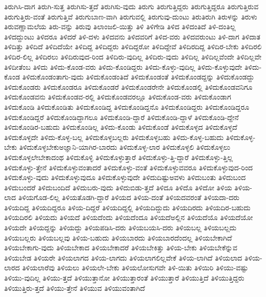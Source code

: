 {ತಿರುಗಿಸಿ-ದಾಗ
ತಿರುಗಿ-ಸುತ್ತ
ತಿರುಗಿಸು-ತ್ತದೆ
ತಿರುಗಿಸು-ವುದು
ತಿರುಗು
ತಿರುಗುತ್ತಿದ್ದರು
ತಿರುಗುತ್ತಿದ್ದರೂ
ತಿರುಗುತ್ತಿರುವ
ತಿರುಗುತ್ತಿರು-ವಂತೆ
ತಿರುಗುತ್ತಿವೆ
ತಿರುಗುಬಾಣ-ವಾಗಿ
ತಿರುಗುವಲ್ಲಿ
ತಿರುಗುವು-ದುಂಟು
ತಿರುತಿರುಗಿ
ತಿರುಳನ್ನು
ತಿರುಳು
ತಿರುವಣ್ಣಾಮಲೆಯ
ತಿರು-ವನ್ನು
ತಿರುವು
ತಿಲಾಂಜಲಿ-ಯಿತ್ತು
ತಿಳಿ
ತಿಳಿಗೇಡಿ
ತಿಳಿದ
ತಿಳಿದಂತಿದೆ
ತಿಳಿ-ದಂತಿಲ್ಲ
ತಿಳಿದದ್ದುಂಟು
ತಿಳಿದರೂ
ತಿಳಿದರೆ
ತಿಳಿ-ದಳು
ತಿಳಿದವನು
ತಿಳಿದವರಿಗೆ
ತಿಳಿದ-ವರು
ತಿಳಿದವರುಂಟು
ತಿಳಿ-ದಾಗ
ತಿಳಿದಾತ
ತಿಳಿದಿತ್ತು
ತಿಳಿದಿದೆ
ತಿಳಿದಿದೆಯೇ
ತಿಳಿದಿದ್ದ
ತಿಳಿದಿದ್ದರು
ತಿಳಿದಿದ್ದರೋ
ತಿಳಿದಿದ್ದೇವೆ
ತಿಳಿದಿರದಿದ್ದ
ತಿಳಿದಿರ-ಬೇಕು
ತಿಳಿದಿರಲಿ
ತಿಳಿದಿರ-ಲಿಲ್ಲ
ತಿಳಿದಿರಲು
ತಿಳಿದಿರುವುದ-ರಿಂದ
ತಿಳಿದಿರು-ವುದಿಲ್ಲ
ತಿಳಿದಿರು-ವುದು
ತಿಳಿದಿಲ್ಲ
ತಿಳಿದಿಲ್ಲವೆಂದೇ
ತಿಳಿದಿಲ್ಲವೇ
ತಿಳಿದೀತೆಂಬ
ತಿಳಿದು
ತಿಳಿದು-ಕೊಂಡ-ವರು
ತಿಳಿದು-ಕೊಂಡಿದ್ದರು
ತಿಳಿದು-ಕೊಳ್ಳು-ವುದಿಲ್ಲ
ತಿಳಿದು-ಕೊಳ್ಳುವುದೇ
ತಿಳಿದು-ಕೊಂಡ
ತಿಳಿದುಕೊಂಡಂತಾಗು-ವುದು
ತಿಳಿದುಕೊಂಡಂತಿದೆ
ತಿಳಿದುಕೊಂಡಂತೆ
ತಿಳಿದುಕೊಂಡದ್ದನ್ನು
ತಿಳಿದುಕೊಂಡದ್ದು
ತಿಳಿದುಕೊಂಡರು
ತಿಳಿದುಕೊಂಡರೂ
ತಿಳಿದುಕೊಂಡರೆ
ತಿಳಿದುಕೊಂಡರೇನೇ
ತಿಳಿದುಕೊಂಡಲ್ಲಿ
ತಿಳಿದುಕೊಂಡವನಿಗೂ
ತಿಳಿದುಕೊಂಡವನು
ತಿಳಿದುಕೊಂಡವ-ರಲ್ಲಿ
ತಿಳಿದುಕೊಂಡವರಲ್ಲೂ
ತಿಳಿದುಕೊಂಡ-ವರು
ತಿಳಿದುಕೊಂಡಾಗ
ತಿಳಿದುಕೊಂಡಿ
ತಿಳಿದುಕೊಂಡಿತು
ತಿಳಿದುಕೊಂಡಿದ್ದ
ತಿಳಿದುಕೊಂಡಿದ್ದನೊ
ತಿಳಿದುಕೊಂಡಿದ್ದರು
ತಿಳಿದುಕೊಂಡಿದ್ದರೂ
ತಿಳಿದುಕೊಂಡಿದ್ದರೆ
ತಿಳಿದುಕೊಂಡಿದ್ದಾಗಲೂ
ತಿಳಿದುಕೊಂಡಿ-ದ್ದಾರೆ
ತಿಳಿದುಕೊಂಡಿ-ದ್ದಾಳೆ
ತಿಳಿದುಕೊಂಡಿ-ದ್ದೇನೆ
ತಿಳಿದುಕೊಂಡಿರ-ಬಹುದು
ತಿಳಿದುಕೊಂಡಿಲ್ಲ
ತಿಳಿದು-ಕೊಂಡು
ತಿಳಿದುಕೊಂಡೆ
ತಿಳಿದುಕೊಳ್ಳದ
ತಿಳಿದುಕೊಳ್ಳದೆ
ತಿಳಿದುಕೊಳ್ಳದೇ
ತಿಳಿದು-ಕೊಳ್ಳ-ಬಲ್ಲ
ತಿಳಿದುಕೊಳ್ಳಬಲ್ಲರು
ತಿಳಿದುಕೊಳ್ಳಬಹು
ತಿಳಿದು-ಕೊಳ್ಳ-ಬಹುದು
ತಿಳಿದುಕೊಳ್ಳ-ಬೇಕು
ತಿಳಿದುಕೊಳ್ಳಬೇಕುಅಜ್ಞಾನಿ-ಯಾಗಿರ-ಬಾರದು
ತಿಳಿದುಕೊಳ್ಳ-ಲಾರ
ತಿಳಿದುಕೊಳ್ಳಲಿ
ತಿಳಿದುಕೊಳ್ಳಲು
ತಿಳಿದುಕೊಳ್ಳಲೇಬೇಕಾದಂಥ
ತಿಳಿದುಕೊಳ್ಳಿ
ತಿಳಿದುಕೊಳ್ಳುತ್ತಾರೆ
ತಿಳಿದುಕೊಳ್ಳು-ತ್ತಿ-ದ್ದಾರೆ
ತಿಳಿದುಕೊಳ್ಳು-ತ್ತಿಲ್ಲ
ತಿಳಿದುಕೊಳ್ಳು-ತ್ತೇನೆ
ತಿಳಿದುಕೊಳ್ಳುವಂತಾದರೆ
ತಿಳಿದುಕೊಳ್ಳು-ವಂತೆ
ತಿಳಿದುಕೊಳ್ಳುವವರೂ
ತಿಳಿದುಕೊಳ್ಳುವುದ-ರಿಂದ
ತಿಳಿದುಕೊಳ್ಳು-ವುದು
ತಿಳಿದುಕೊಳ್ಳುವುದೂ
ತಿಳಿದುಕೊಳ್ಳುವುದೇ
ತಿಳಿದುದಿಷ್ಟುಅವಳು
ತಿಳಿದುಬಂತು
ತಿಳಿದುಬಂದ
ತಿಳಿದುಬಂದರೆ
ತಿಳಿದುಬಂದಿದೆ
ತಿಳಿದುಬರು-ವುದು
ತಿಳಿದುಬಿಡು-ತ್ತದೆ
ತಿಳಿದೂ
ತಿಳಿದೊ
ತಿಳಿದೋ
ತಿಳಿಯ
ತಿಳಿಯ-ಲಾದ
ತಿಳಿಯಗೊಡ-ಲಿಲ್ಲ
ತಿಳಿಯತೊಡಗಿ-ದ್ದಾರೆ
ತಿಳಿಯದ
ತಿಳಿಯ-ದಂತೆ
ತಿಳಿಯದವರಂತೆ
ತಿಳಿಯದಾ-ದರು
ತಿಳಿಯದಿದ್ದ
ತಿಳಿಯದಿದ್ದರೂ
ತಿಳಿಯ-ದಿದ್ದರೆ
ತಿಳಿಯದಿದ್ದಲ್ಲಿ
ತಿಳಿಯದಿದ್ದುದು
ತಿಳಿಯದಿರದು
ತಿಳಿಯದಿರ-ಬಹುದು
ತಿಳಿಯದಿರಲಿ
ತಿಳಿಯದು
ತಿಳಿಯದೆ
ತಿಳಿಯದೆಂದು
ತಿಳಿಯದೆಂದೂ
ತಿಳಿಯದೆಅಲ್ಲಿನ
ತಿಳಿಯದೆಯೊ
ತಿಳಿಯದೆಯೋ
ತಿಳಿಯದೇ
ತಿಳಿಯದ್ದನ್ನು
ತಿಳಿಯದ್ದು
ತಿಳಿಯಪಡಿಸಿ-ದರು
ತಿಳಿಯಬಯಸಿ-ದರು
ತಿಳಿಯಬಲ್ಲ
ತಿಳಿಯಬಲ್ಲದು
ತಿಳಿಯಬಲ್ಲರು
ತಿಳಿಯಬಲ್ಲವು
ತಿಳಿಯ-ಬಹುದು
ತಿಳಿಯಬಾರದು
ತಿಳಿಯಬಾರದೆಂದಲ್ಲ
ತಿಳಿಯಬೇಕಾಗಿದೆ
ತಿಳಿಯಬೇಕಾಗು-ವುದು
ತಿಳಿಯಬೇಕಾದ
ತಿಳಿಯಬೇಕಾದರೆ
ತಿಳಿಯಬೇಕಿತ್ತು
ತಿಳಿಯ-ಬೇಕು
ತಿಳಿಯಬೇಕೆನ್ನುವ
ತಿಳಿಯಬೇಡ
ತಿಳಿಯರೇ
ತಿಳಿಯಲಾಗದ
ತಿಳಿಯ-ಲಾಗದು
ತಿಳಿಯಲಾಗಲಿಲ್ಲವೇಕೆ
ತಿಳಿಯ-ಲಾಗಿದೆ
ತಿಳಿಯಲಾದ
ತಿಳಿಯ-ಲಾರದ
ತಿಳಿಯಲಾರೆವು
ತಿಳಿಯಲು
ತಿಳಿಯಲೇ-ಬೇಕು
ತಿಳಿಯಲೋಸುಗವೇ
ತಿಳಿ-ಯಿತು
ತಿಳಿಯಿರಿ
ತಿಳಿಯು-ವಷ್ಟು
ತಿಳಿಯು-ವುದಿಲ್ಲ
ತಿಳಿಯು-ತ್ತದೆ
ತಿಳಿಯುತ್ತಾನೋ
ತಿಳಿಯುತ್ತಾರಂತೆ
ತಿಳಿಯುತ್ತಾರೆ
ತಿಳಿಯುತ್ತಿದೆ
ತಿಳಿಯುತ್ತಿದ್ದರು
ತಿಳಿಯುತ್ತಿರು-ತ್ತದೆ
ತಿಳಿಯು-ತ್ತೇನೆ
ತಿಳಿಯುವ
ತಿಳಿಯುವಂತಾಗಿದೆ
}
